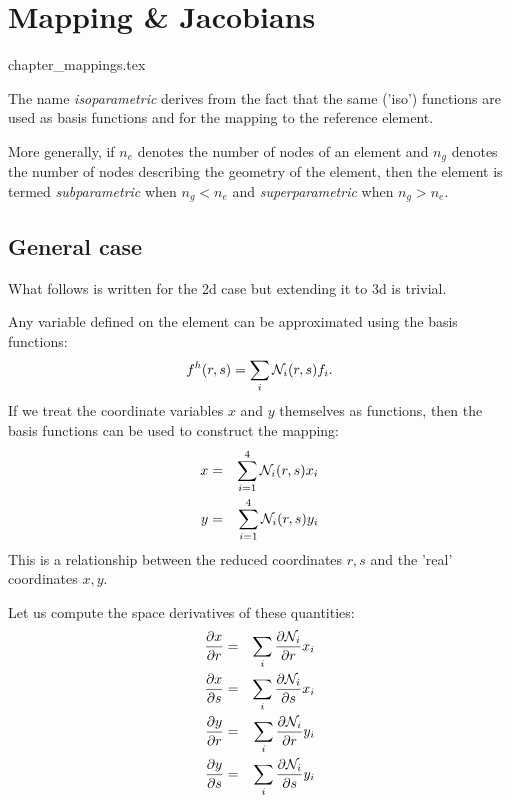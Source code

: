 \chapter{Mapping \& Jacobians} \label{ss:mappings} %

\begin{flushright} {\tiny {\color{gray} chapter\_mappings.tex}} \end{flushright}


The name {\sl isoparametric} derives from the fact that the same ('iso') 
functions are used as basis functions and for the mapping to the reference element.

More generally, if $n_e$ denotes the number of nodes of an element and $n_g$ denotes the 
number of nodes describing the geometry of the element, 
then the element is termed {\sl subparametric} when $n_g<n_e$ and 
{\sl superparametric} when $n_g>n_e$.

\section{General case}

What follows is written for the 2d case but extending it to 3d is trivial.

Any variable defined on the element can be approximated using the basis functions:
\begin{equation}
f^h(r,s)=\sum_i {\mathcal{N}}_i(r,s) f_i.
\end{equation}
If we treat the coordinate variables $x$ and $y$ themselves as functions, 
then the basis functions can be used to construct the mapping:
\begin{eqnarray}
x &=& \sum_{i=1}^4 {\mathcal{N}}_i(r,s) x_i \\
y &=& \sum_{i=1}^4 {\mathcal{N}}_i(r,s) y_i 
\end{eqnarray}
This is a relationship between the reduced coordinates $r,s$ and the 'real'
coordinates $x,y$.

Let us compute the space derivatives of these quantities:
\begin{eqnarray}
\frac{\partial x}{\partial r} &=& \sum_i \frac{\partial {\mathcal{N}}_i}{\partial r} x_i \\
\frac{\partial x}{\partial s} &=& \sum_i \frac{\partial {\mathcal{N}}_i}{\partial s} x_i \\
\frac{\partial y}{\partial r} &=& \sum_i \frac{\partial {\mathcal{N}}_i}{\partial r} y_i \\
\frac{\partial y}{\partial s} &=& \sum_i \frac{\partial {\mathcal{N}}_i}{\partial s} y_i 
\end{eqnarray}

